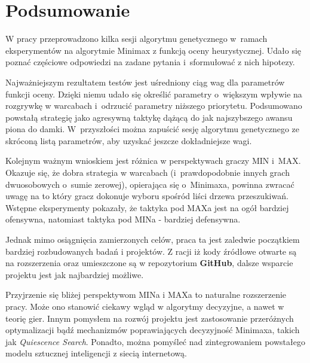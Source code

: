 \chapter*{Podsumowanie}
\thispagestyle{chapterBeginStyle}

W pracy przeprowadzono kilka sesji algorytmu genetycznego w~ramach eksperymentów na algorytmie Minimax z funkcją oceny heurystycznej. Udało się poznać częściowe odpowiedzi na zadane pytania i~sformułować z nich hipotezy.

Najważniejszym rezultatem testów jest uśredniony ciąg wag dla parametrów funkcji oceny. Dzięki niemu udało się określić parametry o~większym wpływie na rozgrywkę w warcabach i~odrzucić parametry niższego priorytetu. Podsumowano powstałą strategię jako agresywną taktykę dążącą do jak najszybszego awansu piona do damki. W~przyszłości można zapuścić sesję algorytmu genetycznego ze skróconą listą parametrów, aby uzyskać jeszcze dokładniejsze wagi.

Kolejnym ważnym wnioskiem jest różnica w perspektywach graczy MIN i~MAX. Okazuje się, że dobra strategia w warcabach (i~prawdopodobnie innych grach dwuosobowych o~sumie zerowej), opierająca się o~Minimaxa, powinna zwracać uwagę na to który gracz dokonuje wyboru spośród liści drzewa przeszukiwań. Wstępne eksperymenty pokazały, że taktyka pod MAXa jest na ogół bardziej ofensywna, natomiast taktyka pod MINa - bardziej defensywna.

Jednak mimo osiągnięcia zamierzonych celów, praca ta jest zaledwie początkiem bardziej rozbudowanych badań i projektów. Z racji iż kody źródłowe otwarte są na rozszerzenia oraz umieszczone są w repozytorium \textbf{GitHub}, dalsze wsparcie projektu jest jak najbardziej możliwe.

Przyjrzenie się bliżej perspektywom MINa i MAXa to naturalne rozszerzenie pracy. Może ono stanowić ciekawy wgląd w algorytmy decyzyjne, a nawet w teorię gier. Innym pomysłem na rozwój projektu jest zastosowanie przeróżnych optymalizacji bądź mechanizmów poprawiających decyzyjność Minimaxa, takich jak \textit{Quiescence Search}. Ponadto, można pomyśleć nad zintegrowaniem powstałego modelu sztucznej inteligencji z siecią internetową.

